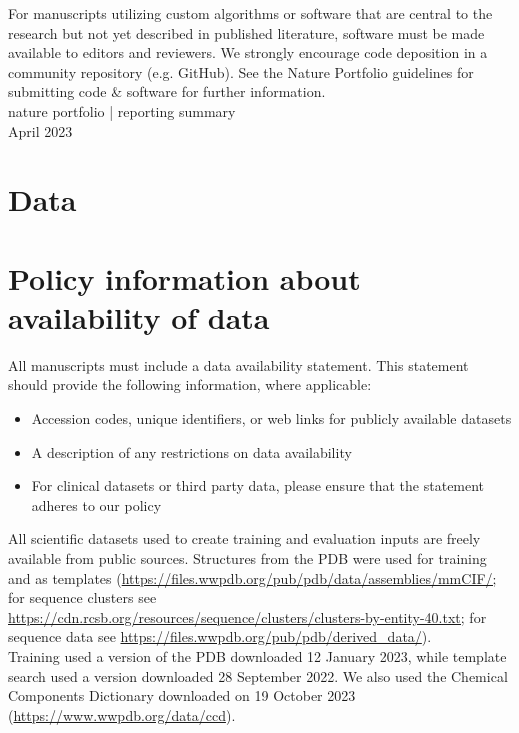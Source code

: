 \documentclass[10pt]{article}
\begin{document}
For manuscripts utilizing custom algorithms or software that are central to the research but not yet described in published literature, software must be made available to editors and reviewers. We strongly encourage code deposition in a community repository (e.g. GitHub). See the Nature Portfolio guidelines for submitting code \& software for further information.\\
nature portfolio | reporting summary\\
April 2023

\section*{Data}
\section*{Policy information about availability of data}
All manuscripts must include a data availability statement. This statement should provide the following information, where applicable:

\begin{itemize}
  \item Accession codes, unique identifiers, or web links for publicly available datasets
  \item A description of any restrictions on data availability
  \item For clinical datasets or third party data, please ensure that the statement adheres to our policy
\end{itemize}

All scientific datasets used to create training and evaluation inputs are freely available from public sources. Structures from the PDB were used for training and as templates (\href{https://files.wwpdb.org/pub/pdb/data/assemblies/mmCIF/;}{https://files.wwpdb.org/pub/pdb/data/assemblies/mmCIF/;} for sequence clusters see \href{https://cdn.rcsb.org/resources/sequence/clusters/clusters-by-entity-40.txt;}{https://cdn.rcsb.org/resources/sequence/clusters/clusters-by-entity-40.txt;} for sequence data see \href{https://files.wwpdb.org/pub/pdb/derived_data/}{https://files.wwpdb.org/pub/pdb/derived\_data/}).\\
Training used a version of the PDB downloaded 12 January 2023, while template search used a version downloaded 28 September 2022. We also used the Chemical Components Dictionary downloaded on 19 October 2023 (\href{https://www.wwpdb.org/data/ccd}{https://www.wwpdb.org/data/ccd}).
\end{document}
